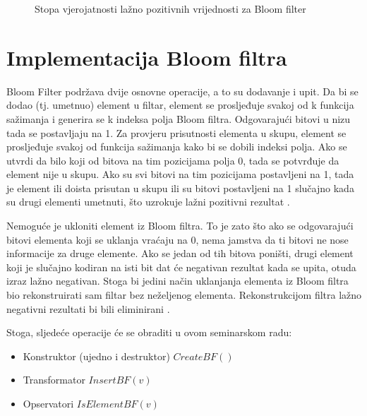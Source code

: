 \documentclass{foi}
\begin{document}
\begin{figure}[H]
    \caption{Stopa vjerojatnosti lažno pozitivnih vrijednosti za Bloom filter}
    \label{fig:bloom-filters}
  \end{figure}


\chapter{Implementacija Bloom filtra}

Bloom Filter podržava dvije osnovne operacije, a to su dodavanje i upit. Da bi se dodao (tj. umetnuo) element u filtar, element se prosljeđuje svakoj od k funkcija sažimanja i generira se k indeksa polja Bloom filtra. Odgovarajući bitovi u nizu tada se postavljaju na 1. Za provjeru prisutnosti elementa u skupu, element se prosljeđuje svakoj od funkcija sažimanja kako bi se dobili indeksi polja. Ako se utvrdi da bilo koji od bitova na tim pozicijama polja 0, tada se potvrđuje da element nije u skupu. Ako su svi bitovi na tim pozicijama postavljeni na 1, tada je element ili doista prisutan u skupu ili su bitovi postavljeni na 1 slučajno kada su drugi elementi umetnuti, što uzrokuje lažni pozitivni rezultat \cite{mei2013string}.

Nemoguće je ukloniti element iz Bloom filtra. To je zato što ako se odgovarajući bitovi elementa koji se uklanja vraćaju na 0, nema jamstva da ti bitovi ne nose informacije za druge elemente. Ako se jedan od tih bitova poništi, drugi element koji je slučajno kodiran na isti bit dat će negativan rezultat kada se upita, otuda izraz lažno negativan. Stoga bi jedini način uklanjanja elementa iz Bloom filtra bio rekonstruirati sam filtar bez neželjenog elementa. Rekonstrukcijom filtra lažno negativni rezultati bi bili eliminirani \cite{mei2013string}.

Stoga, sljedeće operacije će se obraditi u ovom seminarskom radu:
\begin{itemize}
  \item Konstruktor (ujedno i destruktor) $CreateBF()$
  \item Transformator $InsertBF(v)$
  \item Opservatori $IsElementBF(v)$
\end{itemize}
\end{document}
